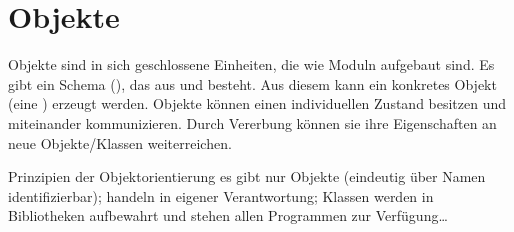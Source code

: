 \section{%
    Objekte%
}

\begin{Def}{Objekte}
     sind in sich geschlossene Einheiten, die wie Moduln
    aufgebaut sind.
    Es gibt ein Schema (), das aus  und
     besteht.
    Aus diesem kann ein konkretes Objekt (eine ) erzeugt
    werden.
    Objekte können einen individuellen Zustand besitzen und miteinander
    kommunizieren.
    Durch Vererbung können sie ihre Eigenschaften an neue Objekte/Klassen
    weiterreichen.
\end{Def}

\begin{Def}{Prinzipien der Objektorientierung}
    es gibt nur Objekte (eindeutig über Namen identifizierbar);
    handeln in eigener Verantwortung;
    Klassen werden in Bibliotheken aufbewahrt und stehen allen
    Programmen zur Verfügung\dots
\end{Def}

\pagebreak
